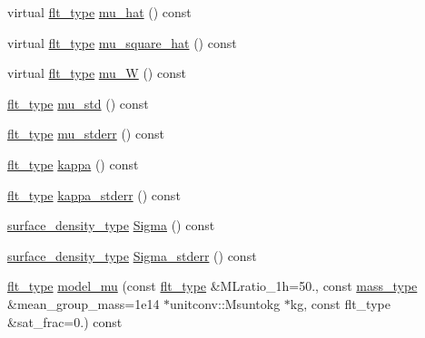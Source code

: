 \begin{DoxyCompactItemize}
\item 
virtual \hyperlink{lib_2IceBRG__main_2common_8h_ad0f130a56eeb944d9ef2692ee881ecc4}{flt\+\_\+type} \hyperlink{classIceBRG_1_1pair__bin__summary_ab594afbd4f1d079ae155402c96a96a5c}{mu\+\_\+hat} () const 
\item 
virtual \hyperlink{lib_2IceBRG__main_2common_8h_ad0f130a56eeb944d9ef2692ee881ecc4}{flt\+\_\+type} \hyperlink{classIceBRG_1_1pair__bin__summary_a1946f8d7063520c70f8f68b705aef8d7}{mu\+\_\+square\+\_\+hat} () const 
\item 
virtual \hyperlink{lib_2IceBRG__main_2common_8h_ad0f130a56eeb944d9ef2692ee881ecc4}{flt\+\_\+type} \hyperlink{classIceBRG_1_1pair__bin__summary_a88ff7f5597f4a10a16fda4bb9f726298}{mu\+\_\+\+W} () const 
\item 
\hyperlink{lib_2IceBRG__main_2common_8h_ad0f130a56eeb944d9ef2692ee881ecc4}{flt\+\_\+type} \hyperlink{classIceBRG_1_1pair__bin__summary_a16bcf11da5f0bd64f763c7012c4584de}{mu\+\_\+std} () const 
\item 
\hyperlink{lib_2IceBRG__main_2common_8h_ad0f130a56eeb944d9ef2692ee881ecc4}{flt\+\_\+type} \hyperlink{classIceBRG_1_1pair__bin__summary_adf391f518873ac7ae22dd0f8aeb74a3d}{mu\+\_\+stderr} () const 
\item 
\hyperlink{lib_2IceBRG__main_2common_8h_ad0f130a56eeb944d9ef2692ee881ecc4}{flt\+\_\+type} \hyperlink{classIceBRG_1_1pair__bin__summary_ae53878e5bc3fdeefd0884231a11337dd}{kappa} () const 
\item 
\hyperlink{lib_2IceBRG__main_2common_8h_ad0f130a56eeb944d9ef2692ee881ecc4}{flt\+\_\+type} \hyperlink{classIceBRG_1_1pair__bin__summary_a91ad26c5cb4049d449b217cd45603696}{kappa\+\_\+stderr} () const 
\item 
\hyperlink{namespaceIceBRG_a80c597ef5ba0a32491d32a9f0083b02d}{surface\+\_\+density\+\_\+type} \hyperlink{classIceBRG_1_1pair__bin__summary_a0e3ba1f366541d48ef94679b4352bbcd}{Sigma} () const 
\item 
\hyperlink{namespaceIceBRG_a80c597ef5ba0a32491d32a9f0083b02d}{surface\+\_\+density\+\_\+type} \hyperlink{classIceBRG_1_1pair__bin__summary_a5aa0edcb2a8528aa090e5035131703a0}{Sigma\+\_\+stderr} () const 
\item 
\hyperlink{lib_2IceBRG__main_2common_8h_ad0f130a56eeb944d9ef2692ee881ecc4}{flt\+\_\+type} \hyperlink{classIceBRG_1_1pair__bin__summary_ac0852be69cc6c7fb267d871e5119a848}{model\+\_\+mu} (const \hyperlink{lib_2IceBRG__main_2common_8h_ad0f130a56eeb944d9ef2692ee881ecc4}{flt\+\_\+type} \&M\+Lratio\+\_\+1h=50., const \hyperlink{namespaceIceBRG_a1be72ac4918a9b029f2eefa084213e35}{mass\+\_\+type} \&mean\+\_\+group\+\_\+mass=1e14 $\ast$unitconv\+::\+Msuntokg $\ast$kg, const flt\+\_\+type \&sat\+\_\+frac=0.) const 

\end{DoxyCompactItemize}
